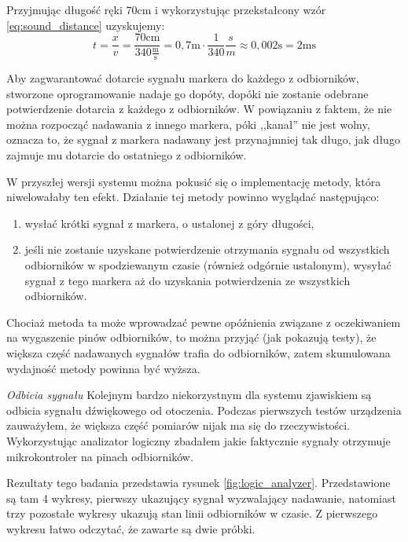 Przyjmując długość ręki 70cm i wykorzystując przekstałcony wzór \ref{eq:sound_distance} uzyskujemy:
\begin{equation}
 t = \frac{x}{v} = \frac{70\textrm{cm}}{340\frac{\textrm{m}}{\textrm{s}}} = 0,7\textrm{m} \cdot \frac{1}{340}\frac{s}{m} \approx 0,002\textrm{s} = 2\textrm{ms}
 \label{eq:reporting_speed}
\end{equation}

Aby zagwarantować dotarcie sygnału markera do każdego z odbiorników, stworzone oprogramowanie nadaje go dopóty, dopóki nie zostanie odebrane potwierdzenie dotarcia z każdego z odbiorników. W powiązaniu z faktem, że nie można rozpocząć nadawania z innego markera, póki ,,kanał'' nie jest wolny, oznacza to, że sygnał z markera nadawany jest przynajmniej tak długo, jak długo zajmuje mu dotarcie do ostatniego z odbiorników.

W przyszłej wersji systemu można pokusić się o implementację metody, która niwelowałaby ten efekt. Działanie tej metody powinno wyglądać następująco:
\begin{enumerate}
 \item wysłać krótki sygnał z markera, o ustalonej z góry długości,
 \item jeśli nie zostanie uzyskane potwierdzenie otrzymania sygnału od wszystkich odbiorników w spodziewanym czasie (również odgórnie ustalonym), wysyłać sygnał z tego markera aż do uzyskania potwierdzenia ze wszystkich odbiorników.
\end{enumerate}
Chociaż metoda ta może wprowadzać pewne opóźnienia związane z oczekiwaniem na wygaszenie pinów odbiorników, to można przyjąć (jak pokazują testy), że większa część nadawanych sygnałów trafia do odbiorników, zatem skumulowana wydajność metody powinna być wyższa.

\textsl{Odbicia sygnału}
Kolejnym bardzo niekorzystnym dla systemu zjawiskiem są odbicia sygnału dźwiękowego od otoczenia. Podczas pierwszych testów urządzenia zauważyłem, że większa część pomiarów nijak ma się do rzeczywistości. Wykorzystując analizator logiczny zbadałem jakie faktycznie sygnały otrzymuje mikrokontroler na pinach odbiorników.

Rezultaty tego badania przedstawia rysunek \ref{fig:logic_analyzer}. Przedstawione są tam 4 wykresy, pierwszy ukazujący sygnał wyzwalający nadawanie, natomiast trzy pozostałe wykresy ukazują stan linii odbiorników w czasie. Z pierwszego wykresu łatwo odczytać, że zawarte są dwie próbki.

